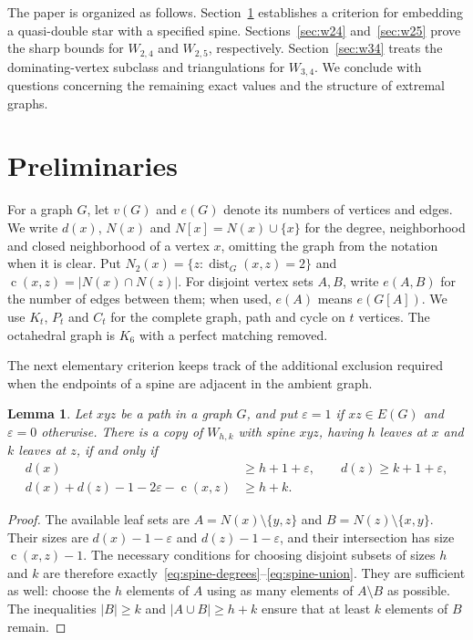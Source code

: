 \documentclass[11pt,a4paper]{article}
\newtheorem{lemma}[theorem]{Lemma}
\theoremstyle{remark}
\newcommand{\cdeg}{\operatorname{c}}
\newcommand{\dist}{\operatorname{dist}}
\begin{document}
The paper is organized as follows. Section~\ref{sec:preliminaries} establishes a criterion for embedding a quasi-double star with a specified spine. Sections~\ref{sec:w24} and~\ref{sec:w25} prove the sharp bounds for $W_{2,4}$ and $W_{2,5}$, respectively. Section~\ref{sec:w34} treats the dominating-vertex subclass and triangulations for $W_{3,4}$. We conclude with questions concerning the remaining exact values and the structure of extremal graphs.


\section{Preliminaries}\label{sec:preliminaries}

For a graph $G$, let $v(G)$ and $e(G)$ denote its numbers of vertices and edges. We write $d(x)$, $N(x)$ and $N[x]=N(x)\cup\{x\}$ for the degree, neighborhood and closed neighborhood of a vertex $x$, omitting the graph from the notation when it is clear. Put $N_2(x)=\{z:\dist_G(x,z)=2\}$ and $\cdeg(x,z)=|N(x)\cap N(z)|$. For disjoint vertex sets $A,B$, write $e(A,B)$ for the number of edges between them; when used, $e(A)$ means $e(G[A])$. We use $K_t$, $P_t$ and $C_t$ for the complete graph, path and cycle on $t$ vertices. The octahedral graph is $K_6$ with a perfect matching removed.

The next elementary criterion keeps track of the additional exclusion required when the endpoints of a spine are adjacent in the ambient graph.

\begin{lemma}\label{lem:spine}
Let $xyz$ be a path in a graph $G$, and put $\varepsilon=1$ if $xz\in E(G)$ and $\varepsilon=0$ otherwise. There is a copy of $W_{h,k}$ with spine $xyz$, having $h$ leaves at $x$ and $k$ leaves at $z$, if and only if
\begin{align}
d(x)&\ge h+1+\varepsilon,\qquad d(z)\ge k+1+\varepsilon,\label{eq:spine-degrees}\\
d(x)+d(z)-1-2\varepsilon-\cdeg(x,z)&\ge h+k.\label{eq:spine-union}
\end{align}
\end{lemma}

\begin{proof}
The available leaf sets are $A=N(x)\setminus\{y,z\}$ and $B=N(z)\setminus\{x,y\}$. Their sizes are $d(x)-1-\varepsilon$ and $d(z)-1-\varepsilon$, and their intersection has size $\cdeg(x,z)-1$. The necessary conditions for choosing disjoint subsets of sizes $h$ and $k$ are therefore exactly~\eqref{eq:spine-degrees}--\eqref{eq:spine-union}. They are sufficient as well: choose the $h$ elements of $A$ using as many elements of $A\setminus B$ as possible. The inequalities $|B|\ge k$ and $|A\cup B|\ge h+k$ ensure that at least $k$ elements of $B$ remain.
\end{proof}
\end{document}
